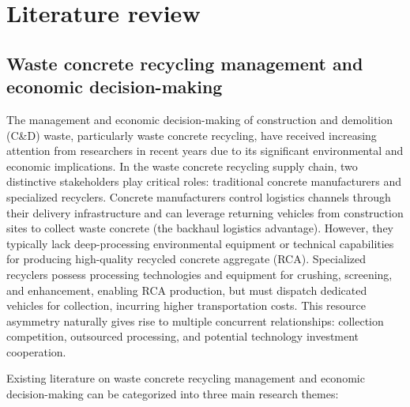 \documentclass[authoryear,preprint,review,times,10pt]{elsarticle}
\begin{document}
\section{Literature review}
\subsection{Waste concrete recycling management and economic decision-making}
The management and economic decision-making of construction and demolition (C\&D) waste, particularly waste concrete recycling, have received increasing attention from researchers in recent years due to its significant environmental and economic implications. In the waste concrete recycling supply chain, two distinctive stakeholders play critical roles: traditional concrete manufacturers and specialized recyclers. Concrete manufacturers control logistics channels through their delivery infrastructure and can leverage returning vehicles from construction sites to collect waste concrete (the backhaul logistics advantage). However, they typically lack deep-processing environmental equipment or technical capabilities for producing high-quality recycled concrete aggregate (RCA). Specialized recyclers possess processing technologies and equipment for crushing, screening, and enhancement, enabling RCA production, but must dispatch dedicated vehicles for collection, incurring higher transportation costs. This resource asymmetry naturally gives rise to multiple concurrent relationships: collection competition, outsourced processing, and potential technology investment cooperation.

Existing literature on waste concrete recycling management and economic decision-making can be categorized into three main research themes:
\end{document}
